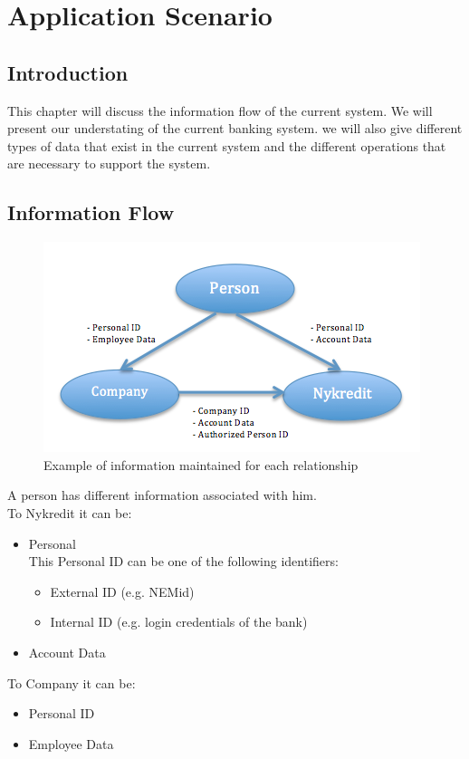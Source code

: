 \chapter{Application Scenario}
\section{Introduction}
This chapter will discuss the information flow of the current system. We will present our understating of the current banking system. we will also give different types of data that exist in the current system and the different operations that are necessary to support the system.
\section{Information Flow}
\begin{figure}[h]
	\centering
	\includegraphics[width=\textwidth]{figures/Flow}
	\caption{Example of information maintained for each relationship}
	\label{fig:Flow}
\end{figure}
A person has different information associated with him. 
\\To Nykredit it can be:
\begin{itemize}
	\item Personal
	 \\This Personal ID can be one of the following identifiers:
	\begin{itemize}
		\item	External ID (e.g. NEMid)
		\item Internal ID (e.g. login credentials of the bank)
	\end{itemize}
\item Account Data
\end{itemize}
To Company it can be:
\begin{itemize}
	\item Personal ID
	\item Employee Data
\end{itemize}
